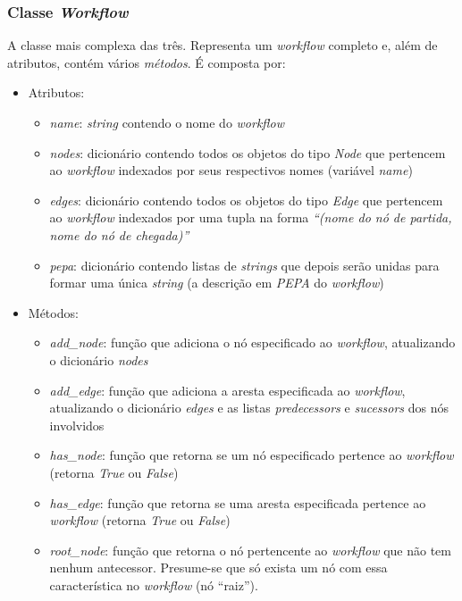 \documentclass[a4paper,11pt]{article}
\begin{document}
        \subsubsection{Classe \emph{Workflow}}

            A classe mais complexa das tr\^es. Representa um \emph{workflow} completo e, além de atributos, cont\'em v\'arios \emph{m\'etodos}. \'E composta por:

            \begin{itemize}
                \item Atributos:
                \begin{itemize}
                    \item \emph{name}: \emph{string} contendo o nome do \emph{workflow}
                    \item \emph{nodes}: dicion\'ario contendo todos os objetos do tipo \emph{Node} que pertencem ao \emph{workflow} indexados por seus respectivos nomes (vari\'avel \emph{name})
                    \item \emph{edges}: dicion\'ario contendo todos os objetos do tipo \emph{Edge} que pertencem ao \emph{workflow} indexados por uma tupla na forma \emph{``(nome do n\'o de partida, nome do n\'o de chegada)''} 
                    \item \emph{pepa}: dicion\'ario contendo listas de \emph{strings} que depois ser\~ao unidas para formar uma \'unica \emph{string} (a descrição em \emph{PEPA} do \emph{workflow}) 
                \end{itemize}
                \item M\'etodos:
                \begin{itemize}
                    \item \emph{add\_node}: funç\~ao que adiciona o n\'o especificado ao \emph{workflow}, atualizando o dicion\'ario \emph{nodes}
                    \item \emph{add\_edge}: funç\~ao que adiciona a aresta especificada ao \emph{workflow}, atualizando o dicion\'ario \emph{edges} e as listas \emph{predecessors} e \emph{sucessors} dos n\'os involvidos
                    \item \emph{has\_node}: funç\~ao que retorna se um n\'o especificado pertence ao \emph{workflow} (retorna \emph{True} ou \emph{False})
                    \item \emph{has\_edge}: funç\~ao que retorna se uma aresta especificada pertence ao \emph{workflow} (retorna \emph{True} ou \emph{False})
                    \item \emph{root\_node}: funç\~ao que retorna o n\'o pertencente ao \emph{workflow} que não tem nenhum antecessor. Presume-se que s\'o exista um n\'o com essa caracter\'istica no \emph{workflow} (n\'o ``raiz'').
                \end{itemize}
            \end{itemize}
 
\end{document}
